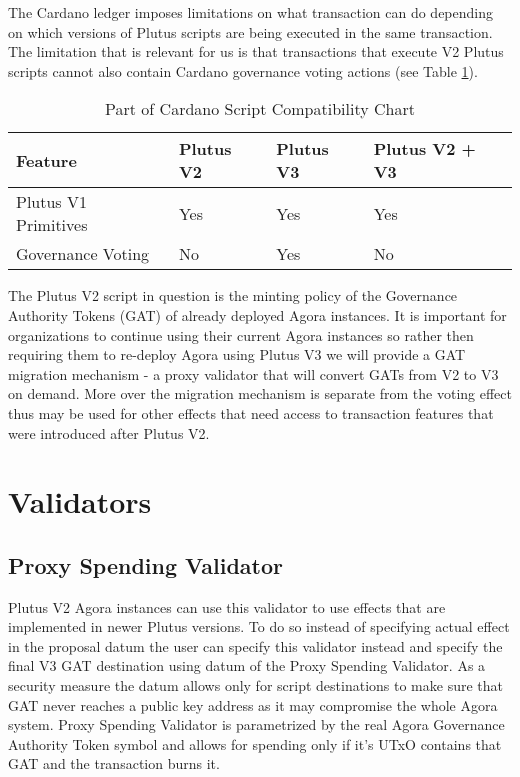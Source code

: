 \documentclass{article}
\begin{document}
The Cardano ledger imposes limitations on what transaction can do depending on which versions of Plutus scripts are being executed in the same transaction.
The limitation that is relevant for us is that transactions that execute V2 Plutus scripts cannot also contain Cardano governance voting actions (see Table \ref{tab:compatibility}).

\begin{table}[H]
  \centering
  \begin{tabular}{l|l|l|l}
    Feature              & Plutus V2 & Plutus V3 & Plutus V2 + V3 \\
    \hline
    Plutus V1 Primitives & Yes       & Yes       & Yes            \\
    Governance Voting    & No        & Yes       & No             \\
  \end{tabular}
  \caption{\label{tab:compatibility}Part of Cardano Script Compatibility Chart}
\end{table}

The Plutus V2 script in question is the minting policy of the Governance Authority Tokens (GAT) of already deployed Agora instances.
It is important for organizations to continue using their current Agora instances so rather then requiring them to re-deploy Agora using Plutus V3 we will provide a GAT migration mechanism - a proxy validator that will convert GATs from V2 to V3 on demand.
More over the migration mechanism is separate from the voting effect thus may be used for other effects that need access to transaction features that were introduced after Plutus V2.

\section{Validators}

\subsection{Proxy Spending Validator}

Plutus V2 Agora instances can use this validator to use effects that are implemented in newer Plutus versions.
To do so instead of specifying actual effect in the proposal datum the user can specify this validator instead and specify the final V3 GAT destination using datum of the Proxy Spending Validator.
As a security measure the datum allows only for script destinations to make sure that GAT never reaches a public key address as it may compromise the whole Agora system.
Proxy Spending Validator is parametrized by the real Agora Governance Authority Token symbol and allows for spending only if it's UTxO contains that GAT and the transaction burns it.
\end{document}
